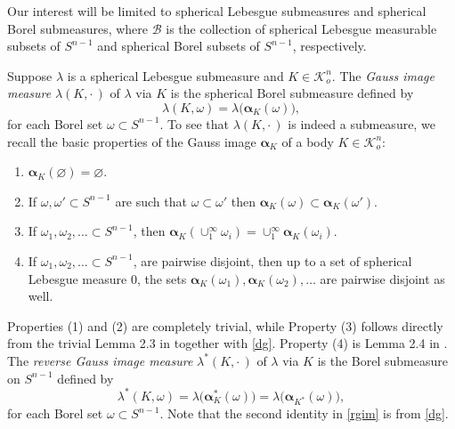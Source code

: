 \documentclass{cpamart1}     %
\theoremstyle{definition}
\theoremstyle{remark}
\newcommand{\sn}{S^{n-1}}
\newcommand{\kno}{\mathcal K^n_o}
\newcommand{\balpha}{\pmb{\alpha}}
\begin{document}
Our interest will be limited to 
spherical Lebesgue submeasures and
spherical Borel submeasures, 
where $\mathcal{B}$ is the collection of spherical Lebesgue measurable subsets of $\sn$ and spherical Borel subsets of $\sn$, respectively.


Suppose $\lambda$ is a spherical Lebesgue submeasure and $K\in\kno$.
The {\it Gauss image measure} $\lambda(K,\cdot\,)$ of $\lambda$ via $K$
is the spherical Borel submeasure defined by
\begin{equation}\label{rgim0}
\lambda(K,\omega) = \lambda\big(\balpha_K(\omega)\big),
\end{equation}
for each Borel set $\omega \subset \sn$.
To see that $\lambda(K,\cdot\,)$ is indeed a submeasure, we recall the basic properties of the Gauss image $\balpha_K$ of a body $K\in\kno$:
\begin{enumerate}
\item 
$\balpha_K(\varnothing)=\varnothing$. 
\item 
If $\omega, \omega' \subset\sn$ are such that $\omega \subset \omega' $ then $\balpha_K(\omega)
\subset
\balpha_K(\omega')$.
\item 
If $\omega_1, \omega_2,\ldots \subset\sn$, then $\balpha_K(\cup_1^\infty \omega_i) 
=
\cup_1^\infty \balpha_K(\omega_i)$.
\item 
If $\omega_1, \omega_2,\ldots \subset\sn$, are pairwise disjoint, then up to a set of spherical Lebesgue measure $0$, the sets
$\balpha_K(\omega_1), \balpha_K(\omega_2),\ldots $ are pairwise disjoint as well.
\end{enumerate}
Properties (1) and (2) are completely trivial, while Property (3) follows directly from the trivial Lemma 2.3 in \cite{HLYZ16} together with \eqref{dg}.
Property (4) is Lemma 2.4 in \cite{HLYZ16}. 
The {\it reverse Gauss image measure} $\lambda^*(K,\cdot\,)$ of $\lambda$ via $K$
is the Borel submeasure on $\sn$ defined by
\begin{equation}\label{rgim}
\lambda^*(K,\omega) 
= 
\lambda\big(\balpha_K^*(\omega)\big)
=
\lambda\big(\balpha_{K^*}(\omega)\big),
\end{equation}
for each Borel set $\omega \subset \sn$.
Note that the second identity in \eqref{rgim} is from \eqref{dg}.
\end{document}
